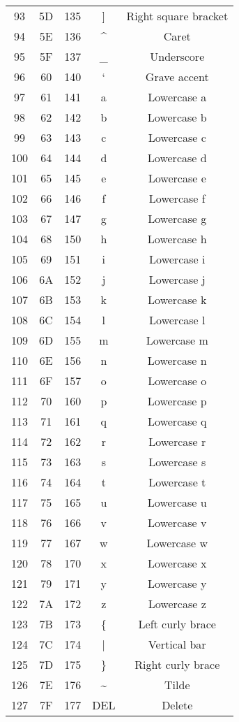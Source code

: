 \documentclass[12pt]{article} %
\begin{document}
\begin{longtable}{|c|c|c|c|c|}
    93 & 5D & 135 & ] & Right square bracket \\
    94 & 5E & 136 & \^{} & Caret \\
    95 & 5F & 137 & \_ & Underscore \\
    96 & 60 & 140 & ` & Grave accent \\
    97 & 61 & 141 & a & Lowercase a \\
    98 & 62 & 142 & b & Lowercase b \\
    99 & 63 & 143 & c & Lowercase c \\
    100 & 64 & 144 & d & Lowercase d \\
    101 & 65 & 145 & e & Lowercase e \\
    102 & 66 & 146 & f & Lowercase f \\
    103 & 67 & 147 & g & Lowercase g \\
    104 & 68 & 150 & h & Lowercase h \\
    105 & 69 & 151 & i & Lowercase i \\
    106 & 6A & 152 & j & Lowercase j \\
    107 & 6B & 153 & k & Lowercase k \\
    108 & 6C & 154 & l & Lowercase l \\
    109 & 6D & 155 & m & Lowercase m \\
    110 & 6E & 156 & n & Lowercase n \\
    111 & 6F & 157 & o & Lowercase o \\
    112 & 70 & 160 & p & Lowercase p \\
    113 & 71 & 161 & q & Lowercase q \\
    114 & 72 & 162 & r & Lowercase r \\
    115 & 73 & 163 & s & Lowercase s \\
    116 & 74 & 164 & t & Lowercase t \\
    117 & 75 & 165 & u & Lowercase u \\
    118 & 76 & 166 & v & Lowercase v \\
    119 & 77 & 167 & w & Lowercase w \\
    120 & 78 & 170 & x & Lowercase x \\
    121 & 79 & 171 & y & Lowercase y \\
    122 & 7A & 172 & z & Lowercase z \\
    123 & 7B & 173 & \{ & Left curly brace \\
    124 & 7C & 174 & | & Vertical bar \\
    125 & 7D & 175 & \} & Right curly brace \\
    126 & 7E & 176 & \~{} & Tilde \\
    127 & 7F & 177 & DEL & Delete \\
    \hline
    \end{longtable}
    
\end{document}
